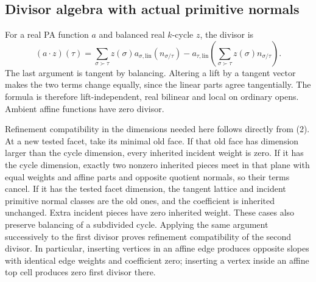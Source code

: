 \documentclass[
  10pt,
]{article}
\begin{document}
\subsection{Divisor algebra with actual primitive
normals}\label{divisor-algebra-with-actual-primitive-normals}

For a real PA function \(a\) and balanced real \(k\)-cycle \(z\), the
divisor is \[
 (a\cdot z)(\tau)=
 \sum_{\sigma\succ\tau}z(\sigma)a_{\sigma,\mathrm{lin}}(n_{\sigma/\tau})
 -a_{\tau,\mathrm{lin}}
       \left(\sum_{\sigma\succ\tau}z(\sigma)n_{\sigma/\tau}\right).
 \tag{2}
\] The last argument is tangent by balancing. Altering a lift by a
tangent vector makes the two terms change equally, since the linear
parts agree tangentially. The formula is therefore lift-independent,
real bilinear and local on ordinary opens. Ambient affine functions have
zero divisor.

Refinement compatibility in the dimensions needed here follows directly
from (2). At a new tested facet, take its minimal old face. If that old
face has dimension larger than the cycle dimension, every inherited
incident weight is zero. If it has the cycle dimension, exactly two
nonzero inherited pieces meet in that plane with equal weights and
affine parts and opposite quotient normals, so their terms cancel. If it
has the tested facet dimension, the tangent lattice and incident
primitive normal classes are the old ones, and the coefficient is
inherited unchanged. Extra incident pieces have zero inherited weight.
These cases also preserve balancing of a subdivided cycle. Applying the
same argument successively to the first divisor proves refinement
compatibility of the second divisor. In particular, inserting vertices
in an affine edge produces opposite slopes with identical edge weights
and coefficient zero; inserting a vertex inside an affine top cell
produces zero first divisor there.
\end{document}
